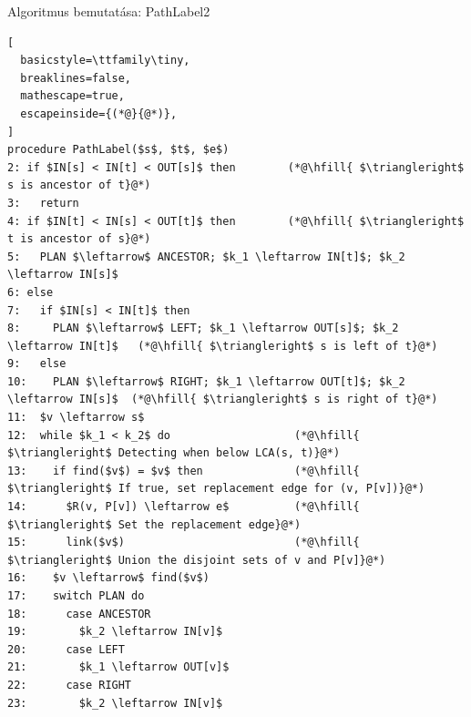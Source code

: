 \begin{frame}[fragile]{Algoritmus bemutatása: PathLabel2}
\tiny
\begin{lstlisting}[
  basicstyle=\ttfamily\tiny,
  breaklines=false,
  mathescape=true,
  escapeinside={(*@}{@*)},
]
procedure PathLabel($s$, $t$, $e$)
2: if $IN[s] < IN[t] < OUT[s]$ then        (*@\hfill{ $\triangleright$ s is ancestor of t}@*)
3:   return
4: if $IN[t] < IN[s] < OUT[t]$ then        (*@\hfill{ $\triangleright$ t is ancestor of s}@*)
5:   PLAN $\leftarrow$ ANCESTOR; $k_1 \leftarrow IN[t]$; $k_2 \leftarrow IN[s]$
6: else
7:   if $IN[s] < IN[t]$ then
8:     PLAN $\leftarrow$ LEFT; $k_1 \leftarrow OUT[s]$; $k_2 \leftarrow IN[t]$   (*@\hfill{ $\triangleright$ s is left of t}@*)
9:   else
10:    PLAN $\leftarrow$ RIGHT; $k_1 \leftarrow OUT[t]$; $k_2 \leftarrow IN[s]$  (*@\hfill{ $\triangleright$ s is right of t}@*)
11:  $v \leftarrow s$
12:  while $k_1 < k_2$ do                   (*@\hfill{ $\triangleright$ Detecting when below LCA(s, t)}@*)
13:    if find($v$) = $v$ then              (*@\hfill{ $\triangleright$ If true, set replacement edge for (v, P[v])}@*)
14:      $R(v, P[v]) \leftarrow e$          (*@\hfill{ $\triangleright$ Set the replacement edge}@*)
15:      link($v$)                          (*@\hfill{ $\triangleright$ Union the disjoint sets of v and P[v]}@*)
16:    $v \leftarrow$ find($v$)
17:    switch PLAN do
18:      case ANCESTOR
19:        $k_2 \leftarrow IN[v]$
20:      case LEFT
21:        $k_1 \leftarrow OUT[v]$
22:      case RIGHT
23:        $k_2 \leftarrow IN[v]$
\end{lstlisting}
\end{frame}

